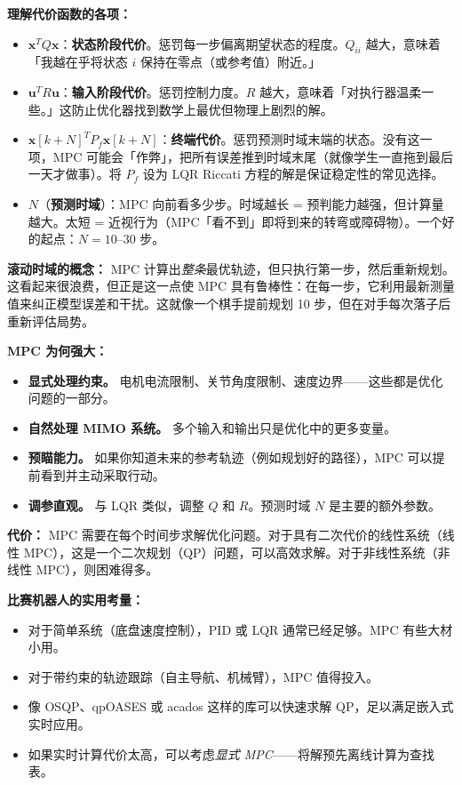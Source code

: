 \textbf{理解代价函数的各项：}
\begin{itemize}
    \item $\mathbf{x}^T Q \mathbf{x}$：\textbf{状态阶段代价}。惩罚每一步偏离期望状态的程度。$Q_{ii}$ 越大，意味着「我越在乎将状态 $i$ 保持在零点（或参考值）附近。」
    \item $\mathbf{u}^T R \mathbf{u}$：\textbf{输入阶段代价}。惩罚控制力度。$R$ 越大，意味着「对执行器温柔一些。」这防止优化器找到数学上最优但物理上剧烈的解。
    \item $\mathbf{x}[k+N]^T P_f \mathbf{x}[k+N]$：\textbf{终端代价}。惩罚预测时域末端的状态。没有这一项，MPC 可能会「作弊」，把所有误差推到时域末尾（就像学生一直拖到最后一天才做事）。将 $P_f$ 设为 LQR Riccati 方程的解是保证稳定性的常见选择。
    \item $N$（\textbf{预测时域}）：MPC 向前看多少步。时域越长 = 预判能力越强，但计算量越大。太短 = 近视行为（MPC「看不到」即将到来的转弯或障碍物）。一个好的起点：$N = 10$--$30$ 步。
\end{itemize}

\textbf{滚动时域的概念：} MPC 计算出\textit{整条}最优轨迹，但只执行第一步，然后重新规划。这看起来很浪费，但正是这一点使 MPC 具有鲁棒性：在每一步，它利用最新测量值来纠正模型误差和干扰。这就像一个棋手提前规划 10 步，但在对手每次落子后重新评估局势。

\textbf{MPC 为何强大：}
\begin{itemize}
    \item \textbf{显式处理约束。} 电机电流限制、关节角度限制、速度边界——这些都是优化问题的一部分。
    \item \textbf{自然处理 MIMO 系统。} 多个输入和输出只是优化中的更多变量。
    \item \textbf{预瞄能力。} 如果你知道未来的参考轨迹（例如规划好的路径），MPC 可以提前看到并主动采取行动。
    \item \textbf{调参直观。} 与 LQR 类似，调整 $Q$ 和 $R$。预测时域 $N$ 是主要的额外参数。
\end{itemize}

\textbf{代价：} MPC 需要在每个时间步求解优化问题。对于具有二次代价的线性系统（线性 MPC），这是一个二次规划（QP）问题，可以高效求解。对于非线性系统（非线性 MPC），则困难得多。

\textbf{比赛机器人的实用考量：}
\begin{itemize}
    \item 对于简单系统（底盘速度控制），PID 或 LQR 通常已经足够。MPC 有些大材小用。
    \item 对于带约束的轨迹跟踪（自主导航、机械臂），MPC 值得投入。
    \item 像 OSQP、qpOASES 或 acados 这样的库可以快速求解 QP，足以满足嵌入式实时应用。
    \item 如果实时计算代价太高，可以考虑\textit{显式 MPC}——将解预先离线计算为查找表。
\end{itemize}

